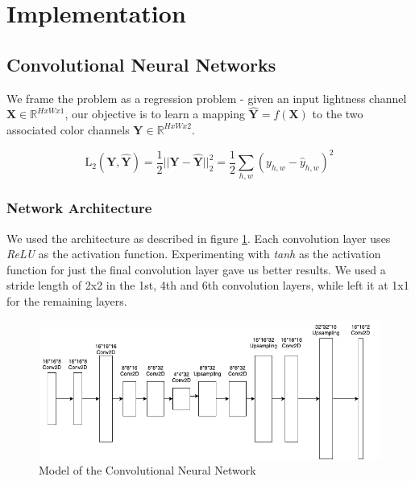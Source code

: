 \documentclass{article}
\begin{document}
\section{Implementation}

\subsection{Convolutional Neural Networks}

We frame the problem as a regression problem - given an input lightness channel
$\mathbf{X} \in \mathbb{R}^{HxWx1}$, our objective is to learn a mapping
$\mathbf{\widehat{Y}} = f(\mathbf{X})$ to the two associated color channels
$\mathbf{Y} \in \mathbb{R}^{HxWx2}$.

\begin{equation}
  \mathrm{L}_2(\mathbf{Y}, \mathbf{\widehat{Y}})
  =
  \frac{1}{2} || \mathbf{Y} - \mathbf{\widehat{Y}} ||^2_2
  =
  \frac{1}{2} \sum_{h, w} (y_{h, w} - \hat{y}_{h, w})^2
\end{equation}

\subsubsection{Network Architecture}

We used the architecture as described in figure \ref{fig:cnn-mse}. Each
convolution layer uses \textit{ReLU} as the activation function. Experimenting
with \textit{tanh} as the activation function for just the final convolution
layer gave us better results. We used a stride length of 2x2 in the 1st, 4th and
6th convolution layers, while left it at 1x1 for the remaining layers.

\begin{figure}[h]
  \centering
  \includegraphics[width=\textwidth]{CNN-MSE-model.png}
  \caption{Model of the Convolutional Neural Network}
  \label{fig:cnn-mse}
  \centering
\end{figure}
\end{document}
